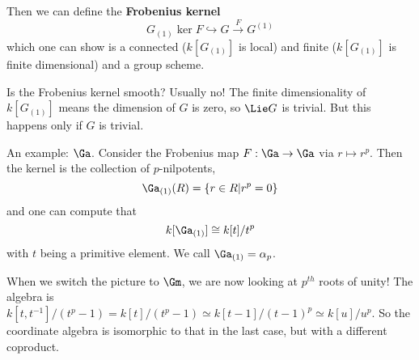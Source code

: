 \documentclass[12pt]{article}
\begin{document}
Then we can define the \textbf{Frobenius kernel}
\[G_{(1)}\ker F\hookrightarrow G\xrightarrow{F} G^{(1)}\]
which one can show is a connected ($k[G_{(1)}]$ is local) and finite ($k[G_{(1)}]$ is finite dimensional) and a group scheme.

Is the Frobenius kernel smooth? Usually no! The finite dimensionality of $k[G_{(1)}]$ means the dimension of $G$ is zero,
so $\Lie G$ is trivial. But this happens only if $G$ is trivial.

\brk

An example: $\Ga$. Consider the Frobenius map $F:\Ga\to \Ga$ via $r\mapsto r^p$. Then the kernel 
is the collection of $p$-nilpotents, 
\[{\Ga}_{(1)}(R)=\{r\in R|r^p=0\}\]
and one can compute that 
\[k[{\Ga}_{(1)}]\cong k[t]/t^p\]
with $t$ being a primitive element. We call ${\Ga}_{(1)}=\alpha_p$.

When we switch the picture to $\Gm$, we are now looking at $p^{th}$ roots of unity! The algebra is 
$k[t,t^{-1}]/(t^p-1)=k[t]/(t^p-1)\simeq k[t-1]/(t-1)^p\simeq k[u]/u^p$. So the coordinate algebra is isomorphic 
to that in the last case, but with a different coproduct.
\end{document}
